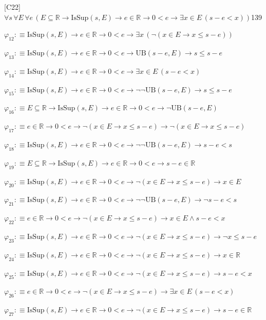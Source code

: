 \begin{fullproof}{[C22]}{$\forall s\,\forall E\,\forall e\,(E \subseteq \mathbb{R} \to \mathrm{IsSup}(s,E) \to e \in \mathbb{R} \to 0 < e \to \exists x \in E\,(s - e < x))$}{139}
\begin{abbrevlist}
\item $\varphi_{12} :\equiv \mathrm{IsSup}(s,E) \to e \in \mathbb{R} \to 0 < e \to \exists x\,(\neg (x \in E \to x \leq s - e))$
\item $\varphi_{13} :\equiv \mathrm{IsSup}(s,E) \to e \in \mathbb{R} \to 0 < e \to \mathrm{UB}(s - e,E) \to s \leq s - e$
\item $\varphi_{14} :\equiv \mathrm{IsSup}(s,E) \to e \in \mathbb{R} \to 0 < e \to \exists x \in E\,(s - e < x)$
\item $\varphi_{15} :\equiv \mathrm{IsSup}(s,E) \to e \in \mathbb{R} \to 0 < e \to \neg \neg \mathrm{UB}(s - e,E) \to s \leq s - e$
\item $\varphi_{16} :\equiv E \subseteq \mathbb{R} \to \mathrm{IsSup}(s,E) \to e \in \mathbb{R} \to 0 < e \to \neg \mathrm{UB}(s - e,E)$
\item $\varphi_{17} :\equiv e \in \mathbb{R} \to 0 < e \to \neg (x \in E \to x \leq s - e) \to \neg (x \in E \to x \leq s - e)$
\item $\varphi_{18} :\equiv \mathrm{IsSup}(s,E) \to e \in \mathbb{R} \to 0 < e \to \neg \neg \mathrm{UB}(s - e,E) \to s - e < s$
\item $\varphi_{19} :\equiv E \subseteq \mathbb{R} \to \mathrm{IsSup}(s,E) \to e \in \mathbb{R} \to 0 < e \to s - e \in \mathbb{R}$
\item $\varphi_{20} :\equiv \mathrm{IsSup}(s,E) \to e \in \mathbb{R} \to 0 < e \to \neg (x \in E \to x \leq s - e) \to x \in E$
\item $\varphi_{21} :\equiv \mathrm{IsSup}(s,E) \to e \in \mathbb{R} \to 0 < e \to \neg \neg \mathrm{UB}(s - e,E) \to \neg s - e < s$
\item $\varphi_{22} :\equiv e \in \mathbb{R} \to 0 < e \to \neg (x \in E \to x \leq s - e) \to x \in E \land s - e < x$
\item $\varphi_{23} :\equiv \mathrm{IsSup}(s,E) \to e \in \mathbb{R} \to 0 < e \to \neg (x \in E \to x \leq s - e) \to \neg x \leq s - e$
\item $\varphi_{24} :\equiv \mathrm{IsSup}(s,E) \to e \in \mathbb{R} \to 0 < e \to \neg (x \in E \to x \leq s - e) \to x \in \mathbb{R}$
\item $\varphi_{25} :\equiv \mathrm{IsSup}(s,E) \to e \in \mathbb{R} \to 0 < e \to \neg (x \in E \to x \leq s - e) \to s - e < x$
\item $\varphi_{26} :\equiv e \in \mathbb{R} \to 0 < e \to \neg (x \in E \to x \leq s - e) \to \exists x \in E\,(s - e < x)$
\item $\varphi_{27} :\equiv \mathrm{IsSup}(s,E) \to e \in \mathbb{R} \to 0 < e \to \neg (x \in E \to x \leq s - e) \to s - e \in \mathbb{R}$

\end{abbrevlist}
\end{fullproof}
